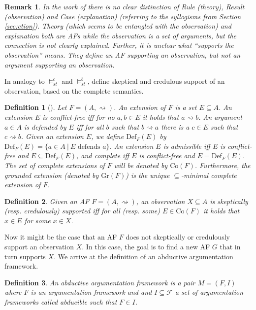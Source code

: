 \documentclass[a4paper]{article}
\newcommand{\entails}{\models}
\newcommand{\compl}{\mathrm{Co}}
\newcommand{\groundext}{\mathrm{Gr}}
\newcommand{\defense}{\mathrm{Def}_F}
\newcommand{\brave}{\ensuremath{\entails_{st}^b}}
\newcommand{\caut}{\ensuremath{\entails_{st}^c}}
\newcommand{\attacks}{\rightsquigarrow}
\newtheorem{definition}{Definition}
\newtheorem{remark}{Remark}
\begin{document}
\begin{remark}
In the work of \citet{DBLP:conf/ecai/BoothGKRT14} there is no clear distinction of \emph{Rule} (theory), \emph{Result} (observation) and \emph{Case} (explanation) (referring to the syllogisms from Section \ref{sec:ction}). Theory (which seems to be entangled with the observation) and explanation both are AFs while the observation is a set of arguments, but the connection is not clearly explained. Further, it is unclear what \enquote{supports the observation} means. They define an AF supporting an observation, but not an argument supporting an observation.
\end{remark}

In analogy to $\caut$ and $\brave$, \citet{DBLP:conf/ecai/BoothGKRT14} define skeptical and credulous support of an observation, based on the complete semantics.

\begin{definition}[{\cite[Defintion 2]{DBLP:conf/ecai/BoothGKRT14}}]
Let $F = (A, \attacks)$. An extension of $F$ is a set $E \subseteq A$. An extension $E$ is conflict-free iff for no $a, b \in E$ it holds that $a \attacks b$. An argument $a \in A$ is defended by $E$ iff for all $b$ such that $b \attacks a$ there is a $c \in E$ such that $c \attacks b$. Given an extension $E$, we define $\defense(E)$ by $\defense(E) = \{ a \in A \ | \ E \text{ defends } a \}$. An extension $E$ is admissible iff $E$ is conflict-free and $E \subseteq \defense(E)$, and complete iff $E$ is conflict-free and $E = \defense(E)$. The set of complete extensions of $F$ will be denoted by $\compl(F)$. Furthermore, the grounded extension (denoted by $\groundext(F)$) is the unique $\subseteq$-minimal complete extension of $F$.
\end{definition}

\begin{definition}
Given an AF $F = (A, \attacks)$, an observation $X \subseteq A$ is skeptically (resp. credulously) supported iff for all (resp. some) $E \in \compl(F)$ it holds that $x \in E$ for some $x \in X$.
\end{definition}

Now it might be the case that an AF $F$ does not skeptically or credulously support an observation $X$. In this case, the goal is to find a new AF $G$ that in turn supports $X$. We arrive at the definition of an abductive argumentation framework.

\begin{definition}
An \emph{abductive argumentation framework} is a pair $M = (F, I)$ where $F$ is an argumentation framework and and $I \subseteq \mathcal{F}$ a set of argumentation frameworks called \emph{abducible} such that $F \in I$.
\end{definition}
\end{document}
